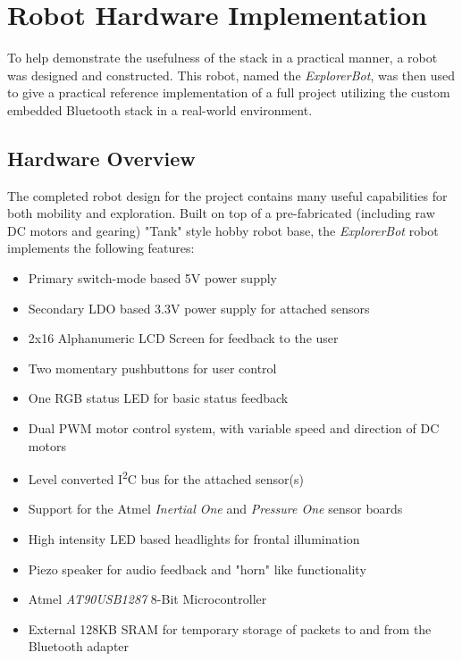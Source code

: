 \chapter{Robot Hardware Implementation}
\label{chp:robothwimp}

To help demonstrate the usefulness of the stack in a practical manner, a robot was designed and constructed. This robot, named the \emph{ExplorerBot}, was then used to give a practical reference implementation of a full project utilizing the custom embedded Bluetooth stack in a real-world environment.

\section{Hardware Overview}

The completed robot design for the project contains many useful capabilities for both mobility and exploration. Built on top of a pre-fabricated (including raw DC motors and gearing) "Tank" style hobby robot base, the \emph{ExplorerBot} robot implements the following features:

\begin{itemize}
	\item Primary switch-mode based 5V power supply
	\item Secondary LDO based 3.3V power supply for attached sensors
	\item 2x16 Alphanumeric LCD Screen for feedback to the user
	\item Two momentary pushbuttons for user control
	\item One RGB status LED for basic status feedback
	\item Dual PWM motor control system, with variable speed and direction of DC motors
	\item Level converted I\textsuperscript{2}C bus for the attached sensor(s)
	\item Support for the Atmel \textit{Inertial One} and \textit{Pressure One} sensor boards
	\item High intensity LED based headlights for frontal illumination
	\item Piezo speaker for audio feedback and "horn" like functionality
	\item Atmel \textit{AT90USB1287} 8-Bit Microcontroller
	\item External 128KB SRAM for temporary storage of packets to and from the Bluetooth adapter
\end{itemize}

